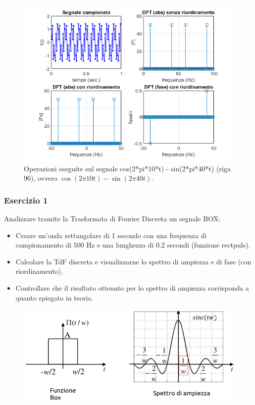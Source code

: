 \documentclass[a4paper]{article}
\begin{document}
	\noindent
	\begin{figure}[!htp]
		\centering
		\includegraphics[width=\textwidth]{img/lab/TdF-4.png}
		\caption{Operazioni eseguite sul segnale \textsf{cos(2*pi*10*t) - sin(2*pi*40*t)} (riga 96), ovvero $\cos\left(2 \pi 10 t\right)- \sin\left(2 \pi 40 t\right)$.}
	\end{figure}\newpage
	
	\subsubsection{Esercizio 1}
	
	Analizzare tramite la Trasformata di Fourier Discreta un segnale BOX:
	\begin{itemize}
		\item Creare un'onda rettangolare di 1 secondo con una frequenza di campionamento di $500$ Hz e una lunghezza di 0.2 secondi (funzione \textsf{rectpuls}).
		
		\item Calcolare la TdF discreta e visualizzarne lo spettro di ampiezza e di fase (con riordinamento).
		
		\item Controllare che il risultato ottenuto per lo spettro di ampiezza corrisponda a quanto spiegato in teoria.
	\end{itemize}
	
	\begin{figure}[!htp]
		\centering
		\includegraphics[width=\textwidth]{img/lab/lab5-1.png}
	\end{figure}
	
\end{document}
